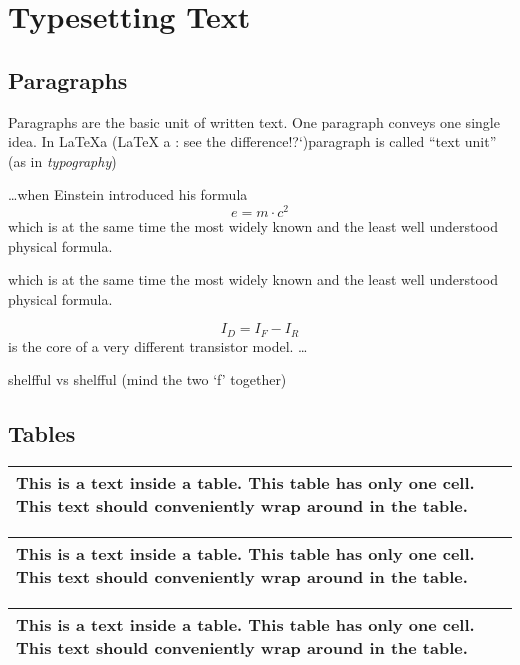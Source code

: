 \section{Typesetting Text}

\subsection{Paragraphs}
Paragraphs are the basic unit of written text. One paragraph conveys one single idea. In \LaTeX a (\LaTeX{} a : see the difference!?`)paragraph is called ``text unit'' (as in \emph{typography})

\ldots when Einstein introduced his formula
\begin{equation}
    e = m \cdot c^2
\end{equation}
which is at the same time the most widely known and the least well \mbox{understood} physical formula.

\noindent
which is at the same time the most widely known and the least well understood physical formula.

\begin{equation}
    I_D = I_F - I_R
\end{equation}
is the core of a very different transistor model. \ldots

\newline
\newline
shelfful vs shelf\mbox{}ful (mind the two `f' together)

\subsection{Tables}

\begin{tabular}{|p{}|}
    \hline
    This is a text inside a table. This table has only one cell. This text should conveniently wrap around in the table.\\
    \hline
    \hline
\end{tabular}
\begin{tabular}{|p{}|}
    \hline
    This is a text inside a table. This table has only one cell. This text should conveniently wrap around in the table.\\
    \hline
    \hline
\end{tabular}
\begin{tabular}{|p{}|}
    \hline
    This is a text inside a table. This table has only one cell. This text should conveniently wrap around in the table.\\
    \hline
    \hline
\end{tabular}

